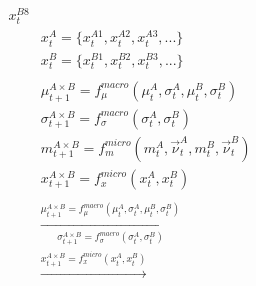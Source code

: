 \documentclass[utf8]{article}
\begin{document}
\begin{align*}
{x}_{t}^{B8} \\&
{x}^A_{t} = \{
{x}_{t}^{A1},
{x}_{t}^{A2},
{x}_{t}^{A3},...\} \\&
{x}^B_{t} = \{
{x}_{t}^{B1},
{x}_{t}^{B2},
{x}_{t}^{B3},...\} \\ \\&
\mu_{t+1}^{A\times B} = f_{\mu}^{macro}(\mu_{t}^{A}, \sigma_{t}^{A}, \mu_{t}^{B}, \sigma_{t}^{B}) \\&
\sigma_{t+1}^{A\times B} = f_{\sigma}^{macro}(\sigma_{t}^{A}, \sigma_{t}^{B}) \\&
{m}^{A\times B}_{t+1} = f_m^{micro}({m}^A_{t},\vec{\nu}^A_{t},{m}^B_{t},\vec{\nu}^B_{t}) \\&
{x}^{A\times B}_{t+1} = f_x^{micro}({x}^A_{t},{x}^B_{t}) \\\\&
\xrightarrow[\sigma_{t+1}^{A\times B} = f_{\sigma}^{macro}(\sigma_{t}^{A}, \sigma_{t}^{B})]{\mu_{t+1}^{A\times B} = f_{\mu}^{macro}(\mu_{t}^{A}, \sigma_{t}^{A}, \mu_{t}^{B}, \sigma_{t}^{B})} \\& 
\xrightarrow[]{{x}^{A\times B}_{t+1} = f_x^{micro}({x}^A_{t},{x}^B_{t})}
\end{align*}
\end{document}
